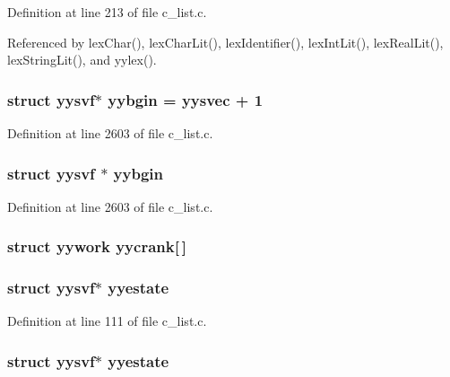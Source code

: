 Definition at line 213 of file c\_\-list.c.

Referenced by lex\-Char(), lex\-Char\-Lit(), lex\-Identifier(), lex\-Int\-Lit(), lex\-Real\-Lit(), lex\-String\-Lit(), and yylex().
\subsubsection{\setlength{\rightskip}{0pt plus 5cm}struct \bf{yysvf}$\ast$ \bf{yybgin} = \bf{yysvec} + 1}\label{c__list_8c_53189c29d05a62c3bf9859c4219161a1}




Definition at line 2603 of file c\_\-list.c.
\subsubsection{\setlength{\rightskip}{0pt plus 5cm}struct \bf{yysvf} $\ast$ \bf{yybgin}}\label{c__list_8c_6b7fc351a473ee81fd6c1d10a14c9491}




Definition at line 2603 of file c\_\-list.c.
\subsubsection{\setlength{\rightskip}{0pt plus 5cm}struct \bf{yywork}
 \bf{yycrank}[$\,$]}\label{c__list_8c_20ec935b8e234333e0a8e746c5022ba0}


\subsubsection{\setlength{\rightskip}{0pt plus 5cm}struct \bf{yysvf}$\ast$ \bf{yyestate}}\label{c__list_8c_8c65940e3c94c87a535845e35eb385f7}




Definition at line 111 of file c\_\-list.c.
\subsubsection{\setlength{\rightskip}{0pt plus 5cm}struct \bf{yysvf}$\ast$ \bf{yyestate}}\label{c__list_8c_8c65940e3c94c87a535845e35eb385f7}




